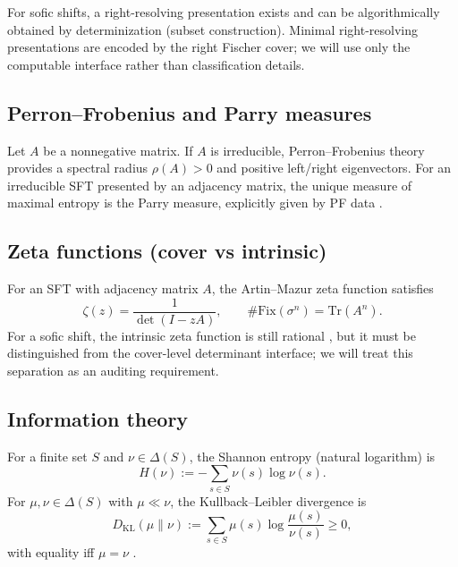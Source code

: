 For sofic shifts, a right-resolving presentation exists and can be algorithmically obtained by determinization (subset construction).
Minimal right-resolving presentations are encoded by the right Fischer cover; we will use only the computable interface rather than classification details.

\subsection{Perron--Frobenius and Parry measures}\label{subsec:prelim-pf-parry}
Let $A$ be a nonnegative matrix. If $A$ is irreducible, Perron--Frobenius theory provides a spectral radius $\rho(A)>0$ and positive left/right eigenvectors.
For an irreducible SFT presented by an adjacency matrix, the unique measure of maximal entropy is the Parry measure, explicitly given by PF data \cite{LindMarcus1995,Kitchens1998SymbolicDynamics}.

\subsection{Zeta functions (cover vs intrinsic)}\label{subsec:prelim-zeta}
For an SFT with adjacency matrix $A$, the Artin--Mazur zeta function satisfies
\[
\zeta(z)=\frac{1}{\det(I-zA)},
\qquad
\#\mathrm{Fix}(\sigma^n)=\mathrm{Tr}(A^n).
\]
For a sofic shift, the intrinsic zeta function is still rational \cite{Manning1971RationalZeta,Weiss1973SFTandSofic}, but it must be distinguished from the cover-level determinant interface; we will treat this separation as an auditing requirement.

\subsection{Information theory}\label{subsec:prelim-it}
For a finite set $S$ and $\nu\in\Delta(S)$, the Shannon entropy (natural logarithm) is
\[
H(\nu):=-\sum_{s\in S}\nu(s)\log \nu(s).
\]
For $\mu,\nu\in\Delta(S)$ with $\mu\ll\nu$, the Kullback--Leibler divergence is
\[
D_{\mathrm{KL}}(\mu\|\nu):=\sum_{s\in S}\mu(s)\log\frac{\mu(s)}{\nu(s)}\ge 0,
\]
with equality iff $\mu=\nu$ \cite{CoverThomas2006,SasonVerdu2016fDivergence}.

